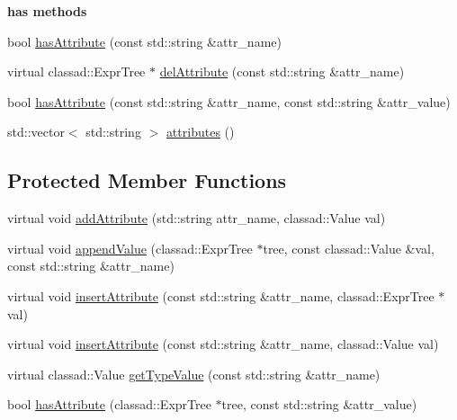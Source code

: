 \begin{Indent}{\bf has methods}\par
\begin{CompactItemize}
\item 
bool \hyperlink{classglite_1_1wms_1_1jdl_1_1Ad_z17_0}{has\-Attribute} (const std::string \&attr\_\-name)
\item 
virtual classad::Expr\-Tree $\ast$ \hyperlink{classglite_1_1wms_1_1jdl_1_1Ad_z17_1}{del\-Attribute} (const std::string \&attr\_\-name)
\item 
bool \hyperlink{classglite_1_1wms_1_1jdl_1_1Ad_z17_2}{has\-Attribute} (const std::string \&attr\_\-name, const std::string \&attr\_\-value)
\item 
std::vector$<$ std::string $>$ \hyperlink{classglite_1_1wms_1_1jdl_1_1Ad_z17_3}{attributes} ()
\end{CompactItemize}
\end{Indent}
\subsection*{Protected Member Functions}
\begin{CompactItemize}
\item 
virtual void \hyperlink{classglite_1_1wms_1_1jdl_1_1Ad_b0}{add\-Attribute} (std::string attr\_\-name, classad::Value val)
\item 
virtual void \hyperlink{classglite_1_1wms_1_1jdl_1_1Ad_b1}{append\-Value} (classad::Expr\-Tree $\ast$tree, const classad::Value \&val, const std::string \&attr\_\-name)
\item 
virtual void \hyperlink{classglite_1_1wms_1_1jdl_1_1Ad_b2}{insert\-Attribute} (const std::string \&attr\_\-name, classad::Expr\-Tree $\ast$val)
\item 
virtual void \hyperlink{classglite_1_1wms_1_1jdl_1_1Ad_b3}{insert\-Attribute} (const std::string \&attr\_\-name, classad::Value val)
\item 
virtual classad::Value \hyperlink{classglite_1_1wms_1_1jdl_1_1Ad_b4}{get\-Type\-Value} (const std::string \&attr\_\-name)
\item 
bool \hyperlink{classglite_1_1wms_1_1jdl_1_1Ad_b5}{has\-Attribute} (classad::Expr\-Tree $\ast$tree, const std::string \&attr\_\-value)
\end{CompactItemize}


